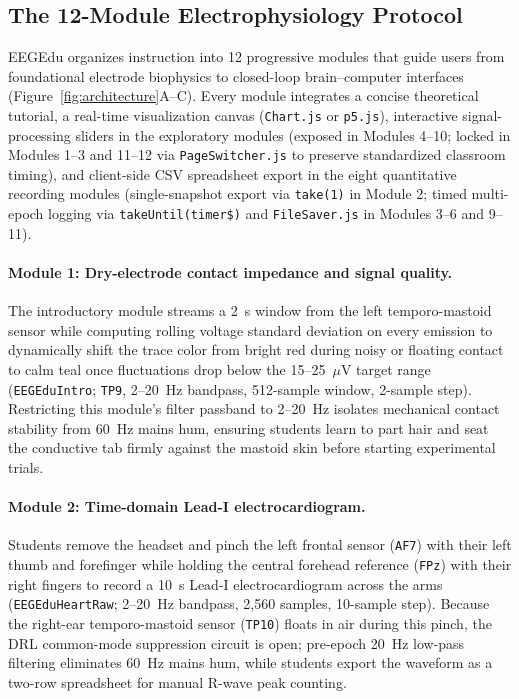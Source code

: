 \documentclass[11pt,letterpaper]{article}
\begin{document}
\subsection{The 12-Module Electrophysiology Protocol}
EEGEdu organizes instruction into 12 progressive modules that guide users from foundational electrode biophysics to closed-loop brain--computer interfaces (Figure~\ref{fig:architecture}A--C). Every module integrates a concise theoretical tutorial, a real-time visualization canvas (\texttt{Chart.js} or \texttt{p5.js}), interactive signal-processing sliders in the exploratory modules (exposed in Modules 4--10; locked in Modules 1--3 and 11--12 via \texttt{PageSwitcher.js} to preserve standardized classroom timing), and client-side CSV spreadsheet export in the eight quantitative recording modules (single-snapshot export via \texttt{take(1)} in Module 2; timed multi-epoch logging via \texttt{takeUntil(timer\$)} and \texttt{FileSaver.js} in Modules 3--6 and 9--11).

\paragraph{Module 1: Dry-electrode contact impedance and signal quality.} The introductory module streams a 2~s window from the left temporo-mastoid sensor while computing rolling voltage standard deviation on every emission to dynamically shift the trace color from bright red during noisy or floating contact to calm teal once fluctuations drop below the 15--25~$\mu\text{V}$ target range (\texttt{EEGEduIntro}; \texttt{TP9}, 2--20~Hz bandpass, 512-sample window, 2-sample step). Restricting this module's filter passband to 2--20~Hz isolates mechanical contact stability from 60~Hz mains hum, ensuring students learn to part hair and seat the conductive tab firmly against the mastoid skin before starting experimental trials.

\paragraph{Module 2: Time-domain Lead-I electrocardiogram.} Students remove the headset and pinch the left frontal sensor (\texttt{AF7}) with their left thumb and forefinger while holding the central forehead reference (\texttt{FPz}) with their right fingers to record a 10~s Lead-I electrocardiogram across the arms (\texttt{EEGEduHeartRaw}; 2--20~Hz bandpass, 2,560 samples, 10-sample step). Because the right-ear temporo-mastoid sensor (\texttt{TP10}) floats in air during this pinch, the DRL common-mode suppression circuit is open; pre-epoch 20~Hz low-pass filtering eliminates 60~Hz mains hum, while students export the waveform as a two-row spreadsheet for manual R-wave peak counting.
\end{document}
